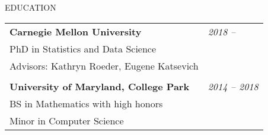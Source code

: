 \documentclass{resume} %
\begin{document}

\begin{rSection}{EDUCATION}

\begin{tabular}{p{14cm}R{2.5cm}}
	\bf{Carnegie Mellon University}  &  \it{2018 -- }  \\ 
	PhD in Statistics and Data Science &  \\ Advisors: Kathryn Roeder, Eugene Katsevich  & \\ &\\
	\textbf{University of Maryland, College Park} & \it{2014 -- 2018}
	 \\  BS in Mathematics with high honors & \\
	 Minor in Computer Science
\end{tabular} 
\end{rSection}





\end{document}
